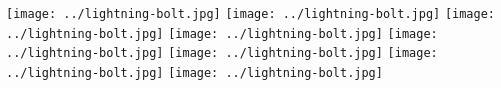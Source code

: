 \documentclass[11pt] {article}
\begin{document}
\begin{landscape}

\texttt{[image: ../lightning-bolt.jpg]}
\texttt{[image: ../lightning-bolt.jpg]}
\texttt{[image: ../lightning-bolt.jpg]}
\texttt{[image: ../lightning-bolt.jpg]}
\texttt{[image: ../lightning-bolt.jpg]}
\texttt{[image: ../lightning-bolt.jpg]}
\texttt{[image: ../lightning-bolt.jpg]}
\texttt{[image: ../lightning-bolt.jpg]}

\end{landscape}
\end{document}
